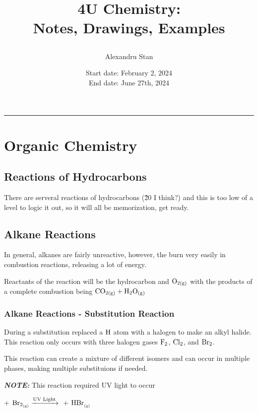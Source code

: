 \documentclass[12pt, a4paper]{article}
\title{
    \textbf{4U Chemistry:\\ Notes, Drawings, Examples}
    \author{Alexandru Stan}
    \date{Start date: February 2, 2024 \\ End date: June 27th, 2024}
}
\newcommand{\fline}{\par\noindent\rule{\textwidth}{0.1pt}}
\newcommand{\gas}{_{\text{(g)}}}
\begin{document}
    \maketitle
    \vfill
    \newpage 

    \tableofcontents
    \fline
    \newpage

    \section{Organic Chemistry}

    \subsection{Reactions of Hydrocarbons}

    There are serveral reactions of hydrocarbons (\~20 I think?) and this is
    too low of a level to logic it out, so it will all be memorization, get
    ready.

    \subsection{Alkane Reactions}

    In general, alkanes are fairly unreactive, however, the burn very easily in combustion
    reactions, releasing a lot of energy.

    Reactants of the reaction will be the hydrocarbon and $\ce{O_{2\text{(g)}}}$ with the products
    of a complete combustion being $\ce{CO_{2\text{(g)}} + H2O_{\text{(g)}}}$

    \subsubsection{Alkane Reactions - Substitution Reaction}

    During a substitution replaced a $\ce{H}$ atom with a halogen to make
    an alkyl halide. This reaction only occurs with three halogen gases $\ce{F2}$, 
    $\ce{Cl2}$, and $\ce{Br2}$. 

    This reaction can create a mixture of different isomers and can occur in multiple
    phases, making multiple substituions if needed.

    \textbf{\textit{NOTE:}} This reaction required UV light to occur

    \begin{center}
        + $\ce{Br_{2\gas} ->[\text{UV Light}]}$ 
        + $\ce{HBr_{\gas}}$
    \end{center}
    
\end{document}
